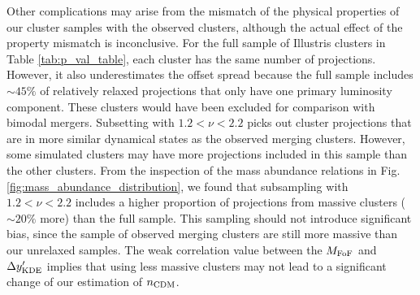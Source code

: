 \documentclass[usenatbib]{mn2e}
\newcommand{\offset}{\Delta {\bf s}}
\begin{document}
{Other complications may arise from the mismatch of the physical properties of 
our cluster samples with the observed clusters, although the actual effect of the
property mismatch is inconclusive. 
For the full sample of Illustris clusters in Table \ref{tab:p_val_table}, 
each cluster has the same number of projections. 
However, it also underestimates the offset spread because the
full sample includes $\sim 45\%$ of relatively relaxed projections 
that only have one primary luminosity component.  These clusters would
have been excluded for comparison with bimodal mergers. 
Subsetting with $1.2 < \nu < 2.2$ picks out
cluster projections that are in more similar dynamical states as the observed merging
clusters. 
However, some simulated clusters may have more projections included in this sample
than the other clusters. From the inspection of the mass abundance relations in 
Fig. \ref{fig:mass_abundance_distribution}, we found that subsampling with $1.2 <
\nu <2.2$ includes a higher proportion of projections from massive clusters
($\sim 20\%$ more) than 
the full sample. 
This sampling should not introduce significant bias, 
since the sample of observed merging clusters are still more massive than our
unrelaxed samples. The weak correlation value between the $M_{\rm FoF}$ and
$\Delta y_{\rm KDE}'$ implies that using less massive clusters may not lead to a significant
change of our estimation of $n_{\rm CDM}$.  
%
% 
%
%
}
\end{document}
